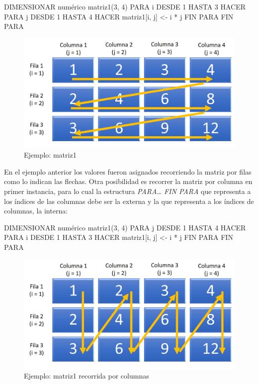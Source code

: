 \documentclass[
]{book}
\newenvironment{Shaded}{\begin{snugshade}}{\end{snugshade}}
\newcommand{\NormalTok}[1]{#1}
\begin{document}
\begin{Shaded}
\begin{Highlighting}[]
\NormalTok{DIMENSIONAR numérico matriz1(3, 4)}
\NormalTok{PARA i DESDE 1 HASTA 3 HACER}
\NormalTok{    PARA j DESDE 1 HASTA 4 HACER}
\NormalTok{        matriz1[i, j] \textless{}{-} i * j}
\NormalTok{    FIN PARA}
\NormalTok{FIN PARA}
\end{Highlighting}
\end{Shaded}

\begin{figure}

{\centering \includegraphics[width=0.8\linewidth]{images/13_matriz1} 

}

\caption{Ejemplo: matriz1}\label{fig:matriz1}
\end{figure}

En el ejemplo anterior los valores fueron asignados recorriendo la matriz por filas como lo indican las flechas. Otra posibilidad es recorrer la matriz por columna en primer instancia, para lo cual la estructura \emph{PARA\ldots{} FIN PARA} que representa a los índices de las columnas debe ser la externa y la que representa a los índices de columnas, la interna:

\begin{Shaded}
\begin{Highlighting}[]
\NormalTok{DIMENSIONAR numérico matriz1(3, 4)}
\NormalTok{PARA j DESDE 1 HASTA 4 HACER}
\NormalTok{    PARA i DESDE 1 HASTA 3 HACER}
\NormalTok{        matriz1[i, j] \textless{}{-} i * j}
\NormalTok{    FIN PARA}
\NormalTok{FIN PARA}
\end{Highlighting}
\end{Shaded}

\begin{figure}

{\centering \includegraphics[width=0.8\linewidth]{images/13_matriz1bis} 

}

\caption{Ejemplo: matriz1 recorrida por columnas}\label{fig:matriz1bis}
\end{figure}
\end{document}
